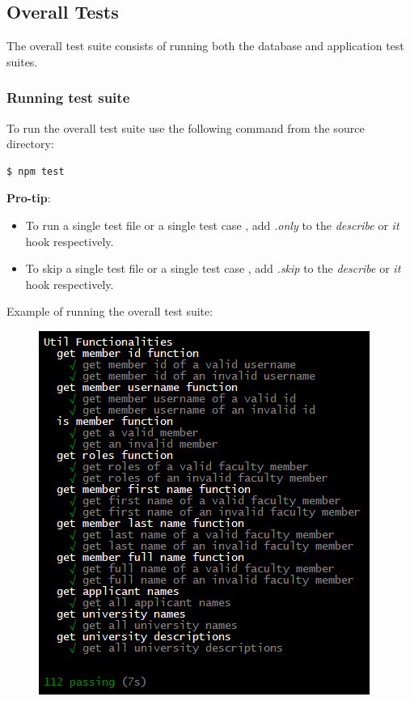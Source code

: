\documentclass[fontsize=12pt,paper=letter,twoside]{scrartcl}
\begin{document}
\newpage
\subsection{Overall Tests}
The overall test suite consists of running both the database and application test suites.

\subsubsection{Running test suite}
To run the overall test suite use the following command from the source directory:

\begin{lstlisting}[language=bash]
	$ npm test
\end{lstlisting}

\bigskip
\noindent \textbf{Pro-tip}: 
\begin{itemize}
\item To run a single test file or a single test case , add \emph{.only} to the \emph{describe} or \emph{it} hook respectively.
\item To skip a single test file or a single test case , add \emph{.skip} to the \emph{describe} or \emph{it} hook respectively.  
\end{itemize}

\bigskip
\noindent Example of running the overall test suite:

\begin{figure}[!htb]
\begin{center}
\includegraphics[width=.6\textwidth]{images/database/run_test.png}
\end{center}
\label{fig:db/run_test}
\end{figure} 
\end{document}
